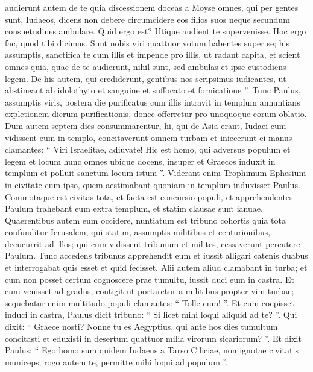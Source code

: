 \begin{biblechapter}
\begin{biblechapter}
\begin{biblechapter}
\begin{biblechapter}
\begin{biblechapter}
\begin{biblechapter}
\begin{biblechapter}
\begin{biblechapter}
\begin{biblechapter}
\begin{biblechapter}
\begin{biblechapter}
\begin{biblechapter}
\begin{biblechapter}
\begin{biblechapter}
\begin{biblechapter}
\begin{biblechapter}
\begin{biblechapter}
\begin{biblechapter}
\begin{biblechapter}
\begin{biblechapter}
\begin{biblechapter}
\verse audierunt autem de te quia discessionem doceas a Moyse omnes, qui per gentes sunt, Iudaeos, dicens non debere circumcidere eos filios suos neque secundum consuetudines ambulare. 
 \verse Quid ergo est? Utique audient te supervenisse. 
\verse Hoc ergo fac, quod tibi dicimus. Sunt nobis viri quattuor votum habentes super se; 
\verse his assumptis, sanctifica te cum illis et impende pro illis, ut radant capita, et scient omnes quia, quae de te audierunt, nihil sunt, sed ambulas et ipse custodiens legem. 
 \verse De his autem, qui crediderunt, gentibus nos scripsimus iudicantes, ut abstineant ab idolothyto et sanguine et suffocato et fornicatione ”.
 \verse Tunc Paulus, assumptis viris, postera die purificatus cum illis intravit in templum annuntians expletionem dierum purificationis, donec offerretur pro unoquoque eorum oblatio.
 \verse Dum autem septem dies consummarentur, hi, qui de Asia erant, Iudaei cum vidissent eum in templo, concitaverunt omnem turbam et iniecerunt ei manus 
 \verse clamantes: “ Viri Israelitae, adiuvate! Hic est homo, qui adversus populum et legem et locum hunc omnes ubique docens, insuper et Graecos induxit in templum et polluit sanctum locum istum ”. 
\verse Viderant enim Trophimum Ephesium in civitate cum ipso, quem aestimabant quoniam in templum induxisset Paulus. 
\verse Commotaque est civitas tota, et facta est concursio populi, et apprehendentes Paulum trahebant eum extra templum, et statim clausae sunt ianuae. 
\verse Quaerentibus autem eum occidere, nuntiatum est tribuno cohortis quia tota confunditur Ierusalem, 
\verse qui statim, assumptis militibus et centurionibus, decucurrit ad illos; qui cum vidissent tribunum et milites, cessaverunt percutere Paulum. 
\verse Tunc accedens tribunus apprehendit eum et iussit alligari catenis duabus et interrogabat quis esset et quid fecisset. 
\verse Alii autem aliud clamabant in turba; et cum non posset certum cognoscere prae tumultu, iussit duci eum in castra. 
\verse Et cum venisset ad gradus, contigit ut portaretur a militibus propter vim turbae; 
\verse sequebatur enim multitudo populi clamantes: “ Tolle eum! ”.
 \verse Et cum coepisset induci in castra, Paulus dicit tribuno: “ Si licet mihi loqui aliquid ad te? ”. Qui dixit: “ Graece nosti? 
\verse Nonne tu es Aegyptius, qui ante hos dies tumultum concitasti et eduxisti in desertum quattuor milia virorum sicariorum? ”. 
\verse Et dixit Paulus: “ Ego homo sum quidem Iudaeus a Tarso Ciliciae, non ignotae civitatis municeps; rogo autem te, permitte mihi loqui ad populum ”. 

\end{biblechapter}
\end{biblechapter}
\end{biblechapter}
\end{biblechapter}
\end{biblechapter}
\end{biblechapter}
\end{biblechapter}
\end{biblechapter}
\end{biblechapter}
\end{biblechapter}
\end{biblechapter}
\end{biblechapter}
\end{biblechapter}
\end{biblechapter}
\end{biblechapter}
\end{biblechapter}
\end{biblechapter}
\end{biblechapter}
\end{biblechapter}
\end{biblechapter}
\end{biblechapter}

